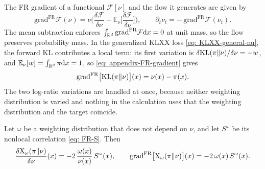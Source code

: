 \documentclass{article}
\begin{document}
The FR gradient of a functional $\mathcal F[\nu]$ and the flow it generates are given by
\begin{equation}
    \mathrm{grad}^{\mathrm{FR}}\mathcal F(\nu) = \nu\biggl(\frac{\delta\mathcal F}{\delta\nu} - \mathbb E_{\nu}\Big[\frac{\delta\mathcal F}{\delta\nu}\Big]\biggr),
    \qquad
    \partial_t\nu_t = -\,\mathrm{grad}^{\mathrm{FR}}\mathcal F(\nu_t).
    \label{eq: appendix-FR-gradient}
\end{equation}
The mean subtraction enforces $\int_{\mathbb R^d}\mathrm{grad}^{\mathrm{FR}}\mathcal F\mathrm{d} x = 0$ at unit mass, so the flow preserves probability mass.
In the generalized KLXX loss \eqref{eq: KLXX-general-nu},
the forward KL contributes a local term: its first variation is $\delta\mathrm{KL}(\pi\|\nu)/\delta\nu = -w$, and $\mathbb E_\nu[w] = \int_{\mathbb R^d}\pi\mathrm{d} x = 1$, so \eqref{eq: appendix-FR-gradient} gives
\begin{equation}
    \mathrm{grad}^{\mathrm{FR}}\bigl[\mathrm{KL}(\pi\|\nu)\bigr](x) = \nu(x)-\pi(x).
    \label{eq: appendix-FR-grad-KL}
\end{equation}
The two log-ratio variations are handled at once, because neither weighting distribution is varied and nothing in the calculation uses that the weighting distribution and the target coincide.

\begin{lemma}
\label{lem: appendix-variation}
Let $\omega$ be a weighting distribution that does not depend on $\nu$, and let $S^{\omega}$ be its nonlocal correlation \eqref{eq: FR-S}. Then
\begin{equation}
    \frac{\delta \mathrm{X}_\omega(\pi\|\nu)}{\delta\nu}(x) = -2\,\frac{\omega(x)}{\nu(x)}\,S^{\omega}(x),
    \qquad
    \mathrm{grad}^{\mathrm{FR}}\bigl[\mathrm{X}_\omega(\pi\|\nu)\bigr](x) = -2\,\omega(x)\,S^{\omega}(x).
    \label{eq: appendix-FR-grad-X}
\end{equation}
\end{lemma}
\end{document}
